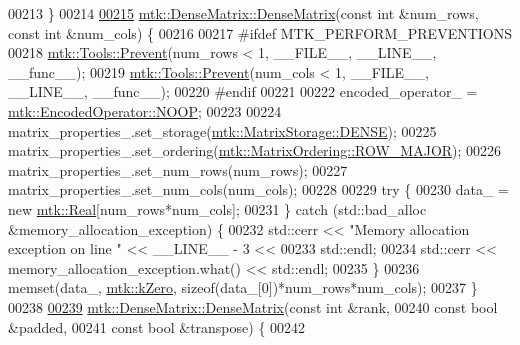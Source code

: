 \begin{DoxyCode}
00213 \}
00214 
\hypertarget{mtk__dense__matrix_8cc_source_l00215}{}\hyperlink{classmtk_1_1DenseMatrix_abe26c623467fc1b293cf4f22a3a47cc8}{00215} \hyperlink{classmtk_1_1DenseMatrix_a0c75ee704707983f935b02835eab0933}{mtk::DenseMatrix::DenseMatrix}(\textcolor{keyword}{const} \textcolor{keywordtype}{int} &num\_rows, \textcolor{keyword}{const} \textcolor{keywordtype}{int} &num\_cols) \{
00216 
00217 \textcolor{preprocessor}{  #ifdef MTK\_PERFORM\_PREVENTIONS}
00218   \hyperlink{classmtk_1_1Tools_a332324c6f25e66be9dff48c5987a3b9f}{mtk::Tools::Prevent}(num\_rows < 1, \_\_FILE\_\_, \_\_LINE\_\_, \_\_func\_\_);
00219   \hyperlink{classmtk_1_1Tools_a332324c6f25e66be9dff48c5987a3b9f}{mtk::Tools::Prevent}(num\_cols < 1, \_\_FILE\_\_, \_\_LINE\_\_, \_\_func\_\_);
00220 \textcolor{preprocessor}{  #endif}
00221 
00222   encoded\_operator\_ = \hyperlink{namespacemtk_ga9b50023bfb2692219d2915feade94f80a722d122e81cbbe543bd5520bb8678c0e}{mtk::EncodedOperator::NOOP};
00223 
00224   matrix\_properties\_.set\_storage(\hyperlink{namespacemtk_ga25b67ec6a2afeee69f9bb196a9c66619a0706fbbd929bd8abc4de386c53d439ff}{mtk::MatrixStorage::DENSE});
00225   matrix\_properties\_.set\_ordering(\hyperlink{namespacemtk_ga622801bd9f912d0f976c3e383f5f581ca21541962976d7709c26e9cd8385bd648}{mtk::MatrixOrdering::ROW\_MAJOR});
00226   matrix\_properties\_.set\_num\_rows(num\_rows);
00227   matrix\_properties\_.set\_num\_cols(num\_cols);
00228 
00229   \textcolor{keywordflow}{try} \{
00230     data\_ = \textcolor{keyword}{new} \hyperlink{group__c01-roots_gac080bbbf5cbb5502c9f00405f894857d}{mtk::Real}[num\_rows*num\_cols];
00231   \} \textcolor{keywordflow}{catch} (std::bad\_alloc &memory\_allocation\_exception) \{
00232     std::cerr << \textcolor{stringliteral}{"Memory allocation exception on line "} << \_\_LINE\_\_ - 3 <<
00233       std::endl;
00234     std::cerr << memory\_allocation\_exception.what() << std::endl;
00235   \}
00236   memset(data\_, \hyperlink{group__c01-roots_ga59a451a5fae30d59649bcda274fea271}{mtk::kZero}, \textcolor{keyword}{sizeof}(data\_[0])*num\_rows*num\_cols);
00237 \}
00238 
\hypertarget{mtk__dense__matrix_8cc_source_l00239}{}\hyperlink{classmtk_1_1DenseMatrix_a4ef0dec1b5558fcf00719bfac059ec68}{00239} \hyperlink{classmtk_1_1DenseMatrix_a0c75ee704707983f935b02835eab0933}{mtk::DenseMatrix::DenseMatrix}(\textcolor{keyword}{const} \textcolor{keywordtype}{int} &rank,
00240                               \textcolor{keyword}{const} \textcolor{keywordtype}{bool} &padded,
00241                               \textcolor{keyword}{const} \textcolor{keywordtype}{bool} &transpose) \{
00242 

\end{DoxyCode}
